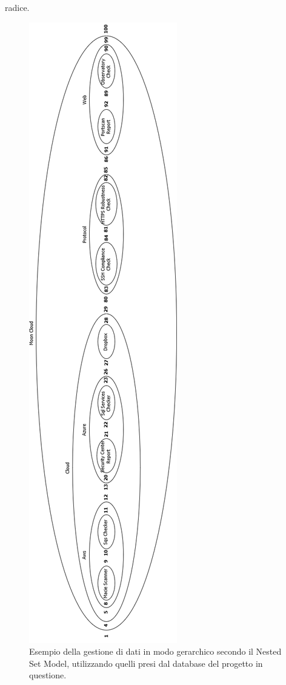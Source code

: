 radice.
%
\begin{figure}[ht!]
    \centering
    \includegraphics[scale=0.4]{images/MC_Rec_NSM_Container.png}
    \caption{Esempio della gestione di dati in modo gerarchico secondo il Nested Set Model, utilizzando quelli presi dal database del 
    progetto in questione.}
    \label{fig:MC_Rec_NSM_Container}
\end{figure}
%
\newpage
%
